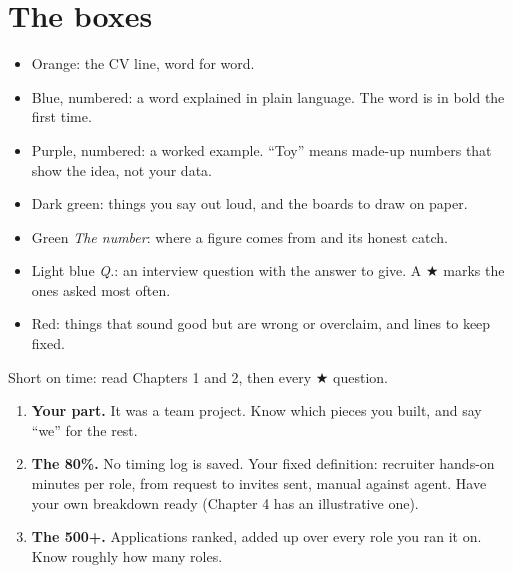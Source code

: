 \section*{The boxes}
\begin{itemize}
  \item Orange: the CV line, word for word.
  \item Blue, numbered: a word explained in plain language. The word is in bold the first time.
  \item Purple, numbered: a worked example. ``Toy'' means made-up numbers that show the idea, not your data.
  \item Dark green: things you say out loud, and the boards to draw on paper.
  \item Green \emph{The number}: where a figure comes from and its honest catch.
  \item Light blue \emph{Q.}: an interview question with the answer to give. A $\bigstar$ marks the ones asked most often.
  \item Red: things that sound good but are wrong or overclaim, and lines to keep fixed.
\end{itemize}
Short on time: read Chapters 1 and 2, then every $\bigstar$ question.

\begin{bugfix}
\begin{enumerate}
  \item \textbf{Your part.} It was a team project. Know which pieces you built, and say ``we'' for the rest.
  \item \textbf{The 80\%.} No timing log is saved. Your fixed definition: recruiter hands-on minutes per role, from request to invites sent, manual against agent. Have your own breakdown ready (Chapter 4 has an illustrative one).
  \item \textbf{The 500+.} Applications ranked, added up over every role you ran it on. Know roughly how many roles.
\end{enumerate}
\end{bugfix}
